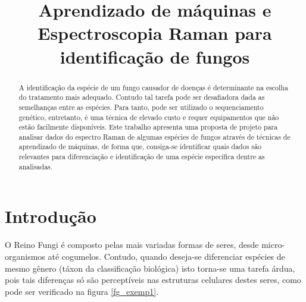\documentclass[conference,peerreview]{IEEEtran}
\begin{document}
\title{Aprendizado de máquinas e Espectroscopia Raman para identificação de fungos}


\author{
} %


\ifCLASSOPTIONpeerreview
	\setcounter{page}{1}
	\IEEEpeerreviewmaketitle
\else
	\maketitle
\fi


\begin{abstract}
A identificação da espécie de um fungo causador de doenças é determinante na escolha do tratamento mais adequado. Contudo tal tarefa pode ser desafiadora dada as semelhanças entre as espécies. Para tanto, pode ser utilizado o sequenciamento genético, entretanto, é uma técnica de elevado custo e requer equipamentos que não estão facilmente disponíveis.
Este trabalho apresenta uma proposta de projeto para analisar dados do espectro Raman de algumas espécies de fungos através de técnicas de aprendizado de máquinas, de forma que, consiga-se identificar quais dados são relevantes para diferenciação e identificação de uma espécie específica dentre as analisadas. 
\end{abstract}

\section{Introdução}
O Reino Fungi é composto pelas mais variadas formas de seres, desde micro-organismos até cogumelos. Contudo, quando deseja-se diferenciar espécies de mesmo gênero (táxon da classificação biológica) isto torna-se uma tarefa árdua, pois tais diferenças só são perceptíveis nas estruturas celulares destes seres, como pode ser verificado na figura \ref{fg_exemp1}.
\end{document}
